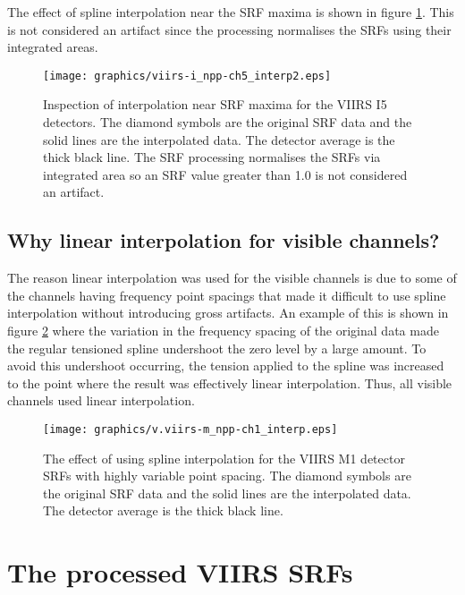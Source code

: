 The effect of spline interpolation near the SRF maxima is shown in figure \ref{fig:high_level_interp}. This is not considered an artifact since the processing normalises the SRFs using their integrated areas.

\begin{figure}[H]
  \centering
  \texttt{[image: graphics/viirs-i\_npp-ch5\_interp2.eps]}
  \caption{Inspection of interpolation near SRF maxima for the VIIRS I5 detectors. The diamond symbols are the original SRF data and the solid lines are the interpolated data. The detector average is the thick black line. The SRF processing normalises the SRFs via integrated area so an SRF value greater than 1.0 is not considered an artifact.}
  \label{fig:high_level_interp}
\end{figure}

\subsection{Why linear interpolation for visible channels?}
The reason linear interpolation was used for the visible channels is due to some of the channels having frequency point spacings that made it difficult to use spline interpolation without introducing gross artifacts. An example of this is shown in figure \ref{fig:vis_no_spline} where the variation in the frequency spacing of the original data made the regular tensioned spline undershoot the zero level by a large amount. To avoid this undershoot occurring, the tension applied to the spline was increased to the point where the result was effectively linear interpolation. Thus, all visible channels used linear interpolation.

\begin{figure}[H]
  \centering
  \texttt{[image: graphics/v.viirs-m\_npp-ch1\_interp.eps]}
  \caption{The effect of using spline interpolation for the VIIRS M1 detector SRFs with highly variable point spacing. The diamond symbols are the original SRF data and the solid lines are the interpolated data. The detector average is the thick black line.}
  \label{fig:vis_no_spline}
\end{figure}


\newpage
\section{The processed VIIRS SRFs}
